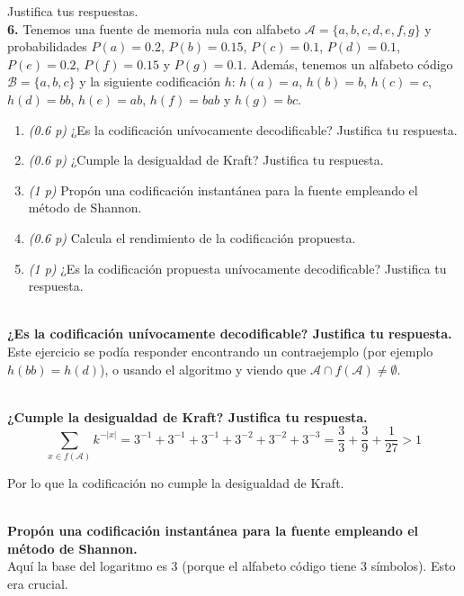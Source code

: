 \documentclass{article}
\begin{document}
Justifica tus respuestas.\\

\textbf{6.} Tenemos una fuente de memoria nula con alfabeto $\mathcal{A}=\{a,b,c,d,e,f,g\}$ y probabilidades $P(a)=0.2$, $P(b)=0.15$, $P(c)=0.1$, $P(d)=0.1$, $P(e)=0.2$, $P(f)=0.15$ y $P(g)=0.1$. Además, tenemos un alfabeto código $\mathcal{B}=\{a,b,c\}$ y la siguiente codificación $h$: $h(a)=a$, $h(b)=b$, $h(c)=c$, $h(d)=bb$, $h(e)=ab$, $h(f)=bab$ y $h(g) = bc$.

\begin{enumerate}
    \item\textit{(0.6 p)} ¿Es la codificación unívocamente decodificable? Justifica tu respuesta.
    \item\textit{(0.6 p)} ¿Cumple la desigualdad de Kraft? Justifica tu respuesta.
    \item\textit{(1 p)} Propón una codificación instantánea para la fuente empleando el método de Shannon.
    \item\textit{(0.6 p)} Calcula el rendimiento de la codificación propuesta.
    \item\textit{(1 p)} ¿Es la codificación propuesta unívocamente decodificable? Justifica tu respuesta.
\end{enumerate}

~\\
\textbf{¿Es la codificación unívocamente decodificable? Justifica tu respuesta.}\\

Este ejercicio se podía responder encontrando un contraejemplo (por ejemplo $h(bb) = h(d)$), o usando el algoritmo y viendo que $\mathcal{A}\cap f(\mathcal{A})\neq\emptyset$.

~\\
\textbf{¿Cumple la desigualdad de Kraft? Justifica tu respuesta.}\\
$$
\sum_{x\in f(\mathcal{A})} k^{-|x|} = 3^{-1} + 3^{-1} + 3^{-1} + 3^{-2} + 3^{-2} + 3^{-3} = \frac{3}{3} + \frac{3}{9} + \frac{1}{27} > 1	
$$

Por lo que la codificación no cumple la desigualdad de Kraft.

~\\
\textbf{Propón una codificación instantánea para la fuente empleando el método de Shannon.}\\

Aquí la base del logaritmo es 3 (porque el alfabeto código tiene 3 símbolos). Esto era crucial.\\
\end{document}

